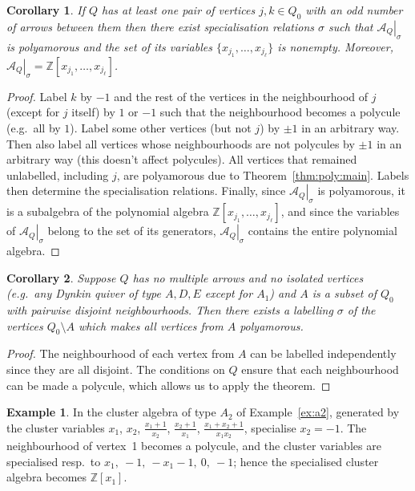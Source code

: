 \documentclass[12pt]{article}
\newtheorem{corollary}{Corollary}
\theoremstyle{definition}
\newtheorem{example}{Example}
\newcommand{\Z}{\mathbb{Z}}
\newcommand{\sA}{\left.\mathcal{A}_Q\right|_\sigma}
\begin{document}
\begin{corollary}
If $Q$ has at least one pair of vertices $j,k\in Q_0$ with an odd number of arrows between them then there exist specialisation relations $\sigma$ such that $\sA$ is polyamorous and the set of its variables $\{x_{j_1},\ldots,x_{j_\ell}\}$ is nonempty. Moreover, $\sA=\Z[x_{j_1},\ldots,x_{j_\ell}]$.
\end{corollary}
\begin{proof}
Label $k$ by $-1$ and the rest of the vertices in the neighbourhood of $j$ (except for $j$ itself) by $1$ or $-1$ such that the neighbourhood becomes a polycule (e.g.\ all by $1$). Label some other vertices (but not $j$) by $\pm1$ in an arbitrary way. Then also label all vertices whose neighbourhoods are not polycules by $\pm1$ in an arbitrary way (this doesn't affect polycules). All vertices that remained unlabelled, including $j$, are polyamorous due to Theorem~\ref{thm:poly:main}. Labels then determine the specialisation relations. Finally, since $\sA$ is polyamorous, it is a subalgebra of the polynomial algebra $\Z[x_{j_1},\ldots,x_{j_\ell}]$, and since the variables of $\sA$ belong to the set of its generators, $\sA$ contains the entire polynomial algebra.
\end{proof}
\begin{corollary}
Suppose $Q$ has no multiple arrows and no isolated vertices (e.g.\ any Dynkin quiver of type $A,D,E$ except for $A_1$) and $A$ is a subset of $Q_0$ with pairwise disjoint neighbourhoods. Then there exists a labelling $\sigma$ of the vertices $Q_0\setminus A$ which makes all vertices from $A$ polyamorous.
\end{corollary}
\begin{proof}
The neighbourhood of each vertex from $A$ can be labelled independently since they are all disjoint. The conditions on $Q$ ensure that each neighbourhood can be made a polycule, which allows us to apply the theorem.
\end{proof}

\begin{example}
\label{ex:spec}
In the cluster algebra of type $A_2$ of Example~\ref{ex:a2}, generated by the cluster variables $x_1$, $x_2$, $\frac{x_1+1}{x_2}$, $\frac{x_2+1}{x_1}$, $\frac{x_1+x_2+1}{x_1x_2}$, specialise $x_2=-1$. The neighbourhood of vertex~1 becomes a polycule, and the cluster variables are specialised resp.\ to $x_1,\ -1,\ -x_1-1,\ 0,\ -1$; hence the specialised cluster algebra becomes $\Z[x_1]$.
\end{example}
\end{document}
